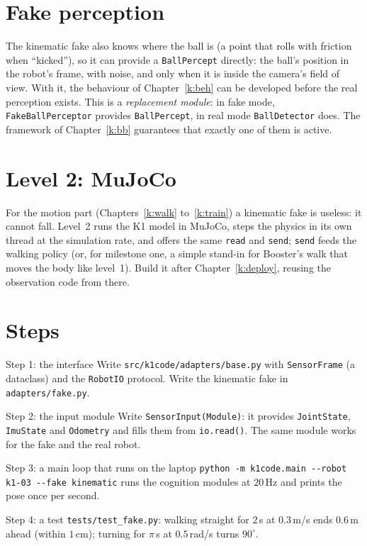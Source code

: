 \section*{Fake perception}
The kinematic fake also knows where the ball is (a point that rolls with friction when ``kicked''), so it can provide a \texttt{BallPercept} directly: the ball's position in the robot's frame, with noise, and only when it is inside the camera's field of view. With it, the behaviour of Chapter~\ref{k:beh} can be developed before the real perception exists. This is a \emph{replacement module}: in fake mode, \texttt{FakeBallPerceptor} provides \texttt{BallPercept}, in real mode \texttt{BallDetector} does. The framework of Chapter~\ref{k:bb} guarantees that exactly one of them is active.

\section*{Level 2: MuJoCo}
For the motion part (Chapters~\ref{k:walk} to~\ref{k:train}) a kinematic fake is useless: it cannot fall. Level~2 runs the K1 model in MuJoCo, steps the physics in its own thread at the simulation rate, and offers the same \texttt{read} and \texttt{send}; \texttt{send} feeds the walking policy (or, for milestone one, a simple stand-in for Booster's walk that moves the body like level~1). Build it after Chapter~\ref{k:deploy}, reusing the observation code from there.

\section*{Steps}
\begin{stepbox}{Step 1: the interface}
Write \texttt{src/k1code/adapters/base.py} with \texttt{SensorFrame} (a dataclass) and the \texttt{RobotIO} protocol. Write the kinematic fake in \texttt{adapters/fake.py}.
\end{stepbox}
\begin{stepbox}{Step 2: the input module}
Write \texttt{SensorInput(Module)}: it provides \texttt{JointState}, \texttt{ImuState} and \texttt{Odometry} and fills them from \verb!io.read()!. The same module works for the fake and the real robot.
\end{stepbox}
\begin{stepbox}{Step 3: a main loop that runs on the laptop}
\verb!python -m k1code.main --robot k1-03 --fake kinematic! runs the cognition modules at $20$\,Hz and prints the pose once per second.
\end{stepbox}
\begin{stepbox}{Step 4: a test}
\texttt{tests/test\_fake.py}: walking straight for $2$\,s at $0.3$\,m/s ends $0.6$\,m ahead (within $1$\,cm); turning for $\pi$\,s at $0.5$\,rad/s turns $90^\circ$.
\end{stepbox}

